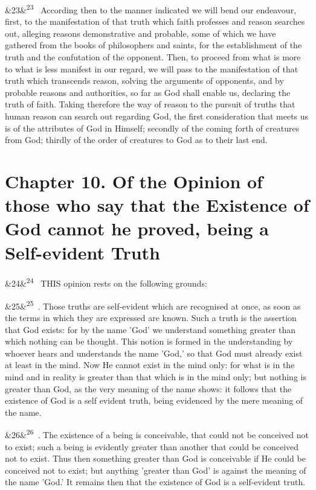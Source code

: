 \documentclass[12pt]{article}
\newcommand{\para}[1][]{\par\noindent\ifx&#1&\else\textsuperscript{\footnotesize #1}~\fi}
\begin{document}
\para[23] According then to the manner indicated we will bend our endeavour, first, to the manifestation of that truth which faith professes and reason searches out, alleging reasons demonstrative and probable, some of which we have gathered from the books of philosophers and saints, for the establishment of the truth and the confutation of the opponent. Then, to proceed from what is more to what is less manifest in our regard, we will pass to the manifestation of that truth which transcends reason, solving the arguments of opponents, and by probable reasons and authorities, so far as God shall enable us, declaring the truth of faith. Taking therefore the way of reason to the pursuit of truths that human reason can search out regarding God, the first consideration that meets us is of the attributes of God in Himself; secondly of the coming forth of creatures from God; thirdly of the order of creatures to God as to their last end.

\section*{Chapter 10. Of the Opinion of those who say that the Existence of God cannot he proved, being a Self-evident Truth}

\para[24] THIS opinion rests on the following grounds:

\para[25] 1. Those truths are self-evident which are recognised at once, as soon as the terms in which they are expressed are known. Such a truth is the assertion that God exists: for by the name 'God' we understand something greater than which nothing can be thought. This notion is formed in the understanding by whoever hears and understands the name 'God,' so that God must already exist at least in the mind. Now He cannot exist in the mind only: for what is in the mind and in reality is greater than that which is in the mind only; but nothing is greater than God, as the very meaning of the name shows: it follows that the existence of God is a self evident truth, being evidenced by the mere meaning of the name.

\para[26] 2. The existence of a being is conceivable, that could not be conceived not to exist; such a being is evidently greater than another that could be conceived not to exist. Thus then something greater than God is conceivable if He could be conceived not to exist; but anything 'greater than God' is against the meaning of the name 'God.' It remains then that the existence of God is a self-evident truth.
\end{document}
